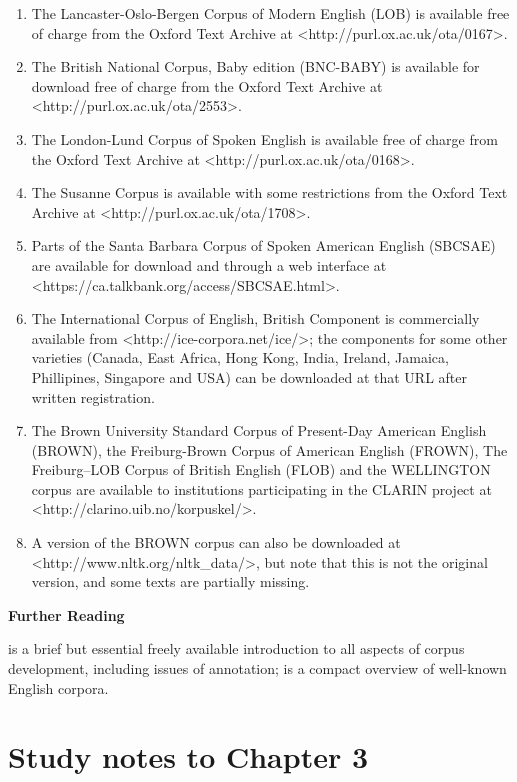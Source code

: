 \begin{enumerate}
  \item The Lancaster-Oslo-Bergen Corpus of Modern English (LOB) is available free of charge from the Oxford Text Archive at <http://purl.ox.ac.uk/ota/0167>.
  \item The British National Corpus, Baby edition (BNC-BABY) is available for download free of charge from the Oxford Text Archive at <http://purl.ox.ac.uk/ota/2553>.
  \item The London-Lund Corpus of Spoken English is available free of charge from the Oxford Text Archive at <http://purl.ox.ac.uk/ota/0168>.
  \item The Susanne Corpus is available with some restrictions from the Oxford Text Archive at <http://purl.ox.ac.uk/ota/1708>.
  \item Parts of the Santa Barbara Corpus of Spoken American English (SBCSAE) are available for download and through a web interface at <https://ca.talkbank.org/access/SBCSAE.html>.
  \item The International Corpus of English, British Component is commercially available from <http://ice-corpora.net/ice/>; the components for some other varieties (Canada, East Africa, Hong Kong, India, Ireland, Jamaica, Phillipines, Singapore and USA) can be downloaded at that URL after written registration.
  \item The Brown University Standard Corpus of Present-Day American English (BROWN), the Freiburg-Brown Corpus of American English (FROWN), The Freiburg–LOB Corpus of British English (FLOB) and the WELLINGTON corpus are available to institutions participating in the CLARIN project at <http://clarino.uib.no/korpuskel/>.
  \item A version of the BROWN corpus can also be downloaded at <http://www.nltk.org/nltk\_data/>, but note that this is not the original version, and some texts are partially missing.
\end{enumerate}

\textbf{Further Reading}

\citet{wynne_developing_2005} is a brief but essential freely available introduction to all aspects of corpus development, including issues of annotation; \citet{ludeling_well-known_2008} is a compact overview of well-known English corpora.


\section{Study notes to Chapter 3}
\label{sec:studynotes03}


